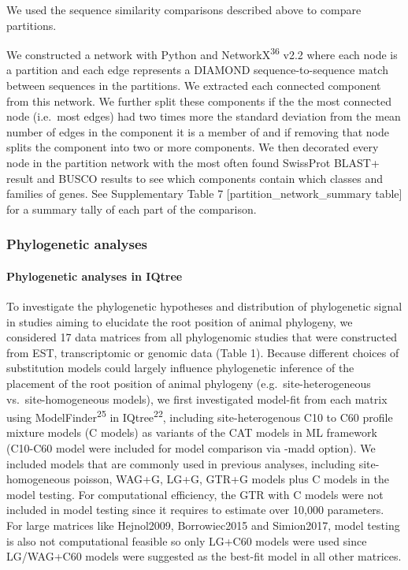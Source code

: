 \documentclass[]{article}
\let\oldparagraph\paragraph
\renewcommand{\paragraph}[1]{\oldparagraph{#1}\mbox{}}
\begin{document}
We used the sequence similarity comparisons described above to compare
partitions.

We constructed a network with Python and NetworkX\textsuperscript{36}
v2.2 where each node is a partition and each edge represents a DIAMOND
sequence-to-sequence match between sequences in the partitions. We
extracted each connected component from this network. We further split
these components if the the most connected node (i.e.~most edges) had
two times more the standard deviation from the mean number of edges in
the component it is a member of and if removing that node splits the
component into two or more components. We then decorated every node in
the partition network with the most often found SwissProt BLAST+ result
and BUSCO results to see which components contain which classes and
families of genes. See Supplementary Table 7
{[}partition\_network\_summary table{]} for a summary tally of each part
of the comparison.

\hypertarget{phylogenetic-analyses}{%
\subsubsection{Phylogenetic analyses}\label{phylogenetic-analyses}}

\hypertarget{phylogenetic-analyses-in-iqtree}{%
\paragraph{Phylogenetic analyses in
IQtree}\label{phylogenetic-analyses-in-iqtree}}

To investigate the phylogenetic hypotheses and distribution of
phylogenetic signal in studies aiming to elucidate the root position of
animal phylogeny, we considered 17 data matrices from all phylogenomic
studies that were constructed from EST, transcriptomic or genomic data
(Table 1). Because different choices of substitution models could
largely influence phylogenetic inference of the placement of the root
position of animal phylogeny (e.g.~site-heterogeneous
vs.~site-homogeneous models), we first investigated model-fit from each
matrix using ModelFinder\textsuperscript{25} in
IQtree\textsuperscript{22}, including site-heterogenous C10 to C60
profile mixture models (C models) as variants of the CAT models in ML
framework (C10-C60 model were included for model comparison via -madd
option). We included models that are commonly used in previous analyses,
including site-homogeneous poisson, WAG+G, LG+G, GTR+G models plus C
models in the model testing. For computational efficiency, the GTR with
C models were not included in model testing since it requires to
estimate over 10,000 parameters. For large matrices like Hejnol2009,
Borrowiec2015 and Simion2017, model testing is also not computational
feasible so only LG+C60 models were used since LG/WAG+C60 models were
suggested as the best-fit model in all other matrices.
\end{document}
